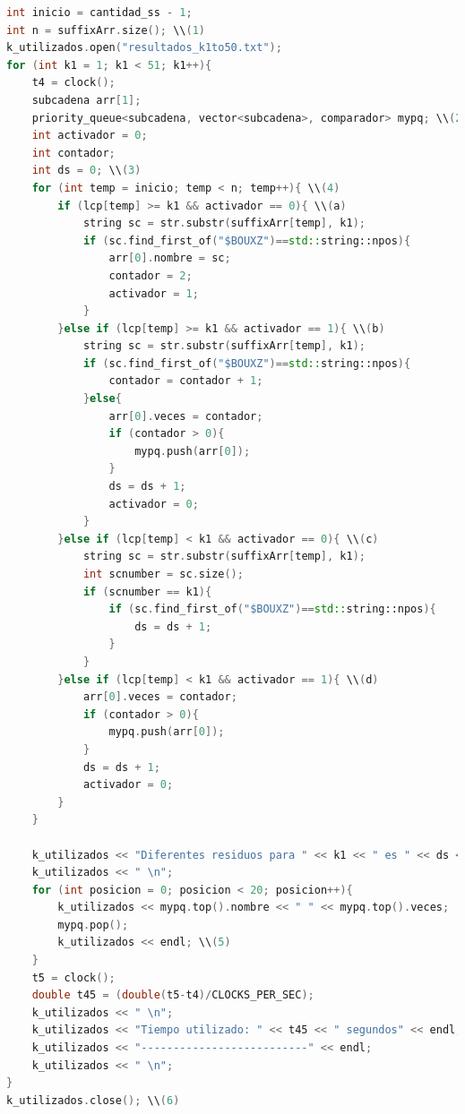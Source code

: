 \begin{lstlisting}[language=C++, caption=Obtención de los diferentes substrings de largo $k$ y los 20 substrings que más se repiten para la cadena de proteínas]
int inicio = cantidad_ss - 1;
int n = suffixArr.size(); \\(1)
k_utilizados.open("resultados_k1to50.txt");
for (int k1 = 1; k1 < 51; k1++){
    t4 = clock();
    subcadena arr[1];
    priority_queue<subcadena, vector<subcadena>, comparador> mypq; \\(2)
    int activador = 0;
    int contador;
    int ds = 0; \\(3)
    for (int temp = inicio; temp < n; temp++){ \\(4)
        if (lcp[temp] >= k1 && activador == 0){ \\(a)
            string sc = str.substr(suffixArr[temp], k1);
            if (sc.find_first_of("$BOUXZ")==std::string::npos){
                arr[0].nombre = sc;
                contador = 2;
                activador = 1;
            }
        }else if (lcp[temp] >= k1 && activador == 1){ \\(b)
            string sc = str.substr(suffixArr[temp], k1);
            if (sc.find_first_of("$BOUXZ")==std::string::npos){
                contador = contador + 1;
            }else{
                arr[0].veces = contador;
                if (contador > 0){
                    mypq.push(arr[0]);
                }
                ds = ds + 1;
                activador = 0;
            }
        }else if (lcp[temp] < k1 && activador == 0){ \\(c)
            string sc = str.substr(suffixArr[temp], k1);
            int scnumber = sc.size();
            if (scnumber == k1){
                if (sc.find_first_of("$BOUXZ")==std::string::npos){
                    ds = ds + 1;
                }
            }
        }else if (lcp[temp] < k1 && activador == 1){ \\(d)
            arr[0].veces = contador;
            if (contador > 0){
                mypq.push(arr[0]);
            }
            ds = ds + 1;
            activador = 0;
        }
    }

    k_utilizados << "Diferentes residuos para " << k1 << " es " << ds << endl;
    k_utilizados << " \n";
    for (int posicion = 0; posicion < 20; posicion++){
        k_utilizados << mypq.top().nombre << " " << mypq.top().veces;
        mypq.pop();
        k_utilizados << endl; \\(5)
    }
    t5 = clock();
    double t45 = (double(t5-t4)/CLOCKS_PER_SEC);
    k_utilizados << " \n"; 
    k_utilizados << "Tiempo utilizado: " << t45 << " segundos" << endl;
    k_utilizados << "--------------------------" << endl;
    k_utilizados << " \n";
}
k_utilizados.close(); \\(6)
	
\end{lstlisting}

